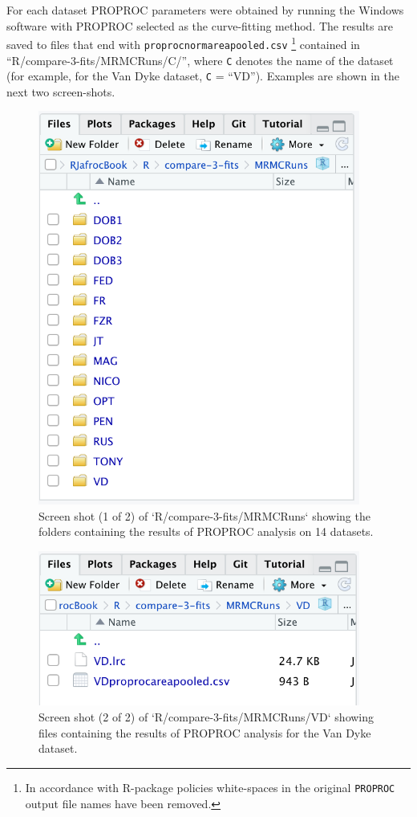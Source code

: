 \documentclass[
]{book}
\begin{document}
For each dataset PROPROC parameters were obtained by running the Windows software with PROPROC selected as the curve-fitting method. The results are saved to files that end with \texttt{proprocnormareapooled.csv} \footnote{In accordance with R-package policies white-spaces in the original \texttt{PROPROC} output file names have been removed.} contained in ``R/compare-3-fits/MRMCRuns/C/'', where \texttt{C} denotes the name of the dataset (for example, for the Van Dyke dataset, \texttt{C} = ``VD''). Examples are shown in the next two screen-shots.

\begin{figure}

{\centering \includegraphics[width=300pt]{images/compare-3-fits/MRMCRuns} 

}

\caption{Screen shot (1 of 2) of `R/compare-3-fits/MRMCRuns` showing the folders containing the results of PROPROC analysis on 14 datasets.}\label{fig:rsm-3-fits-mrmc-runs}
\end{figure}

\begin{figure}

{\centering \includegraphics[width=300pt]{images/compare-3-fits/MRMCRuns-VD} 

}

\caption{Screen shot (2 of 2) of `R/compare-3-fits/MRMCRuns/VD` showing files containing the results of PROPROC analysis for the Van Dyke dataset.}\label{fig:rsm-3-fits-mrmc-runs-vd}
\end{figure}
\end{document}
